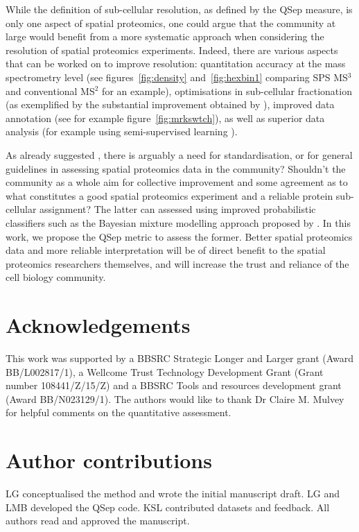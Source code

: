 \documentclass[12pt]{article}\usepackage[]{graphicx}\usepackage[]{color}
\begin{document}
While the definition of sub-cellular resolution, as defined by the
QSep measure, is only one aspect of spatial proteomics, one could
argue that the community at large would benefit from a more systematic
approach when considering the resolution of spatial proteomics
experiments. Indeed, there are various aspects that can be worked on
to improve resolution: quantitation accuracy at the mass spectrometry
level (see figures~\ref{fig:density} and~\ref{fig:hexbin1} comparing
SPS MS$^3$ and conventional MS$^2$ for an example), optimisations in
sub-cellular fractionation (as exemplified by the substantial
improvement obtained by \citep{Christoforou:2016}), improved data
annotation (see for example figure~\ref{fig:mrkswtch}), as well as
superior data analysis (for example using semi-supervised learning
\citet{Breckels:2013}).

As already suggested \cite{Lund-Johansen:2016}, there is arguably a
need for standardisation, or for general guidelines in assessing
spatial proteomics data in the community?  Shouldn't the community as
a whole aim for collective improvement and some agreement as to what
constitutes a good spatial proteomics experiment and a reliable
protein sub-cellular assignment? The latter can assessed using
improved probabilistic classifiers such as the Bayesian mixture
modelling approach proposed by \citet{Crook:2018}. In this work, we
propose the QSep metric to assess the former. Better spatial
proteomics data and more reliable interpretation will be of direct
benefit to the spatial proteomics researchers themselves, and will
increase the trust and reliance of the cell biology community.

\section*{Acknowledgements}

This work was supported by a BBSRC Strategic Longer and Larger grant
(Award BB/L002817/1), a Wellcome Trust Technology Development Grant
(Grant number 108441/Z/15/Z) and a BBSRC Tools and resources
development grant (Award BB/N023129/1). The authors would like to
thank Dr Claire M. Mulvey for helpful comments on the quantitative
assessment.

\section*{Author contributions}

LG conceptualised the method and wrote the initial manuscript
draft. LG and LMB developed the QSep code. KSL contributed datasets
and feedback. All authors read and approved the manuscript.
\end{document}
